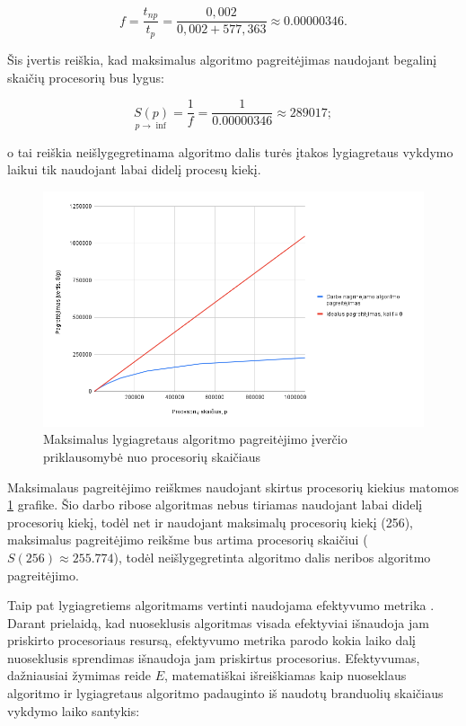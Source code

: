 \documentclass{VUMIFPSbakalaurinis}
\begin{document}
\[ f = \frac{t_{np}}{t_p} = \frac{0,002}{0,002+577,363} \approx 0.00000346 .\]

Šis įvertis reiškia, kad maksimalus algoritmo pagreitėjimas naudojant begalinį skaičių procesorių bus lygus:

\[ \underset{p \rightarrow \inf}{S(p)} = \frac{1}{f} = \frac{1}{0.00000346} \approx 289017  ;\]

o tai reiškia neišlygegretinama algoritmo dalis turės įtakos lygiagretaus vykdymo laikui tik naudojant labai didelį procesų kiekį.

\begin{figure}[H]
    \centering
    \includegraphics[scale=0.5]{img/max_speedup.png}
    \caption{Maksimalus lygiagretaus algoritmo pagreitėjimo įverčio priklausomybė nuo procesorių skaičiaus}
    \label{img:max_speedup}
\end{figure}

Maksimalaus pagreitėjimo reiškmes naudojant skirtus procesorių kiekius matomos \ref{img:max_speedup} grafike.
Šio darbo ribose algoritmas nebus tiriamas naudojant labai didelį procesorių kiekį, todėl net ir naudojant maksimalų procesorių kiekį (256),
maksimalus pagreitėjimo reikšme bus artima procesorių skaičiui ($S(256) \approx 255.774$), todėl neišlygegretinta algoritmo dalis neribos algoritmo pagreitėjimo.  

Taip pat lygiagretiems algoritmams vertinti naudojama efektyvumo metrika \cite{eager1989speedup}.
Darant prielaidą, kad nuoseklusis algoritmas visada efektyviai išnaudoja jam priskirto procesoriaus resursą, efektyvumo metrika parodo kokia laiko dalį nuoseklusis sprendimas išnaudoja jam priskirtus procesorius.
Efektyvumas, dažniausiai žymimas reide $E$, matematiškai išreiškiamas kaip nuoseklaus algoritmo ir lygiagretaus algoritmo padauginto iš naudotų branduolių skaičiaus vykdymo laiko santykis:
\end{document}
